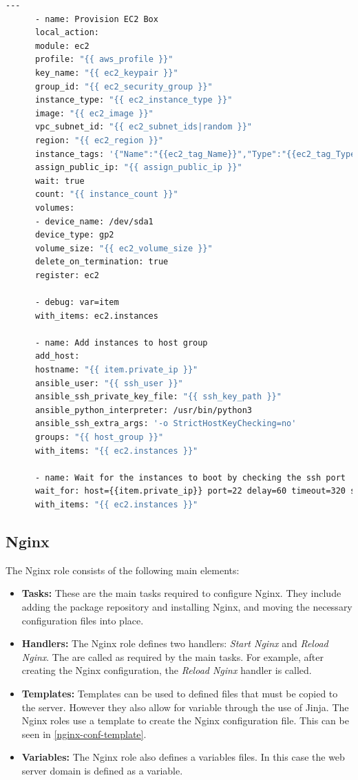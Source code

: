 \documentclass[a4paper]{article}
\begin{document}
		\begin{minipage}{\textwidth}
      \begin{lstlisting}[caption={provision-ec2-instance/tasks/main.yml},label=provision-tasks,language=bash]
      ---
      - name: Provision EC2 Box
      local_action:
      module: ec2
      profile: "{{ aws_profile }}"
      key_name: "{{ ec2_keypair }}"
      group_id: "{{ ec2_security_group }}"
      instance_type: "{{ ec2_instance_type }}"
      image: "{{ ec2_image }}"
      vpc_subnet_id: "{{ ec2_subnet_ids|random }}"
      region: "{{ ec2_region }}"
      instance_tags: '{"Name":"{{ec2_tag_Name}}","Type":"{{ec2_tag_Type}}","Environment":"{{ec2_tag_Environment}}"}'
      assign_public_ip: "{{ assign_public_ip }}"
      wait: true
      count: "{{ instance_count }}"
      volumes:
      - device_name: /dev/sda1
      device_type: gp2
      volume_size: "{{ ec2_volume_size }}"
      delete_on_termination: true
      register: ec2
      
      - debug: var=item
      with_items: ec2.instances
      
      - name: Add instances to host group
      add_host:
      hostname: "{{ item.private_ip }}"
      ansible_user: "{{ ssh_user }}"
      ansible_ssh_private_key_file: "{{ ssh_key_path }}"
      ansible_python_interpreter: /usr/bin/python3
      ansible_ssh_extra_args: '-o StrictHostKeyChecking=no'
      groups: "{{ host_group }}"
      with_items: "{{ ec2.instances }}"
      
      - name: Wait for the instances to boot by checking the ssh port
      wait_for: host={{item.private_ip}} port=22 delay=60 timeout=320 state=started
      with_items: "{{ ec2.instances }}"
      \end{lstlisting}
    \end{minipage}
    
    \subsection{Nginx}
    The Nginx role consists of the following main elements:
    \begin{itemize}
      \item \textbf{Tasks:} These are the main tasks required to configure Nginx. They include adding the package repository and installing Nginx, and moving the necessary configuration files into place.
      \item \textbf{Handlers:} The Nginx role defines two handlers: \textit{Start Nginx} and \textit{Reload Nginx}. The are called as required by the main tasks. For example, after creating the Nginx configuration, the \textit{Reload Nginx} handler is called.
      \item \textbf{Templates:} Templates can be used to defined files that must be copied to the server. However they also allow for variable through the use of Jinja. The Nginx roles use a template to create the Nginx configuration file. This can be seen in  \autoref{nginx-conf-template}.
      \item \textbf{Variables:} The Nginx role also defines a variables files. In this case the web server domain is defined as a variable.
    \end{itemize}
\end{document}
